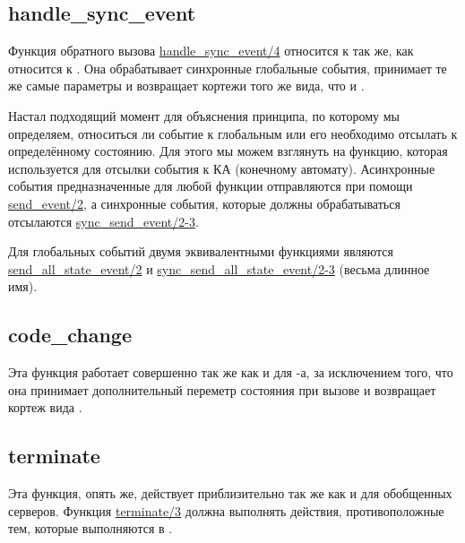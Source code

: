 \subsection{handle\_sync\_event}
\label{handle-sync-event}
Функция обратного вызова \href{http://erldocs.com/R15B/stdlib/gen\_fsm.html\#handle\_sync\_event/4}{handle\_sync\_event/4} относится к  так же, как  относится к .
Она обрабатывает синхронные глобальные события, принимает те же самые параметры и возвращает кортежи того же вида, что и .

Настал подходящий момент для объяснения принципа, по которому мы определяем, относиться ли событие к глобальным или его необходимо отсылать к определённому состоянию.
Для этого мы можем взглянуть на функцию, которая используется для отсылки события к КА (конечному автомату).
Асинхронные события предназначенные для любой функции  отправляются при помощи \href{http://erldocs.com/R15B/stdlib/gen\_fsm.html\#send\_event/2}{send\_event/2}, а синхронные события, которые должны обрабатываться  отсылаются \href{http://erldocs.com/R15B/stdlib/gen\_fsm.html\#sync\_send\_event/2}{sync\_send\_event/2-3}.

Для глобальных событий двумя эквивалентными функциями являются \href{http://erldocs.com/R15B/stdlib/gen\_fsm.html\#send\_all\_state\_event/2}{send\_all\_state\_event/2} и \href{http://erldocs.com/R15B/stdlib/gen\_fsm.html\#sync\_send\_all\_state\_event/2}{sync\_send\_all\_state\_event/2-3} (весьма длинное имя).

\subsection{code\_change}
\label{code-change}
Эта функция работает совершенно так же как и для \--а, за исключением того, что она принимает дополнительный переметр состояния при вызове  и возвращает кортеж вида .

\subsection{terminate}
\label{terminate}
Эта функция, опять же, действует приблизительно так же как и для обобщенных серверов.
Функция \href{http://erldocs.com/R15B/stdlib/gen\_fsm.html\#terminate/3}{terminate/3} должна выполнять действия, противоположные тем, которые выполняются в .
